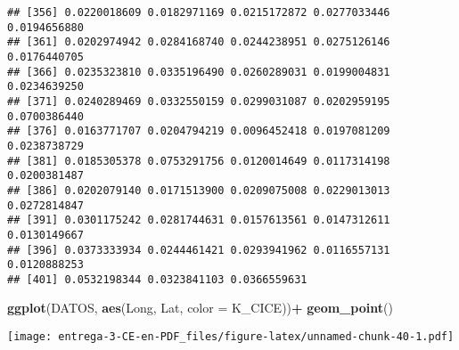 \documentclass[
]{article}
\newenvironment{Shaded}{\begin{snugshade}}{\end{snugshade}}
\newcommand{\DataTypeTok}[1]{\textcolor[rgb]{0.13,0.29,0.53}{#1}}
\newcommand{\DecValTok}[1]{\textcolor[rgb]{0.00,0.00,0.81}{#1}}
\newcommand{\KeywordTok}[1]{\textcolor[rgb]{0.13,0.29,0.53}{\textbf{#1}}}
\newcommand{\NormalTok}[1]{#1}
\newcommand{\OperatorTok}[1]{\textcolor[rgb]{0.81,0.36,0.00}{\textbf{#1}}}
\newcommand{\StringTok}[1]{\textcolor[rgb]{0.31,0.60,0.02}{#1}}
\begin{document}
\begin{verbatim}
## [356] 0.0220018609 0.0182971169 0.0215172872 0.0277033446 0.0194656880
## [361] 0.0202974942 0.0284168740 0.0244238951 0.0275126146 0.0176440705
## [366] 0.0235323810 0.0335196490 0.0260289031 0.0199004831 0.0234639250
## [371] 0.0240289469 0.0332550159 0.0299031087 0.0202959195 0.0700386440
## [376] 0.0163771707 0.0204794219 0.0096452418 0.0197081209 0.0238738729
## [381] 0.0185305378 0.0753291756 0.0120014649 0.0117314198 0.0200381487
## [386] 0.0202079140 0.0171513900 0.0209075008 0.0229013013 0.0272814847
## [391] 0.0301175242 0.0281744631 0.0157613561 0.0147312611 0.0130149667
## [396] 0.0373333934 0.0244461421 0.0293941962 0.0116557131 0.0120888253
## [401] 0.0532198344 0.0323841103 0.0366559631
\end{verbatim}

\begin{Shaded}
\begin{Highlighting}[]
\KeywordTok{ggplot}\NormalTok{(DATOS, }\KeywordTok{aes}\NormalTok{(Long, Lat, }\DataTypeTok{color =}\NormalTok{ K_CICE))}\OperatorTok{+}
\StringTok{  }\KeywordTok{geom_point}\NormalTok{()}
\end{Highlighting}
\end{Shaded}

\texttt{[image: entrega-3-CE-en-PDF\_files/figure-latex/unnamed-chunk-40-1.pdf]}

\begin{Shaded}
\end{Shaded}
\end{document}
